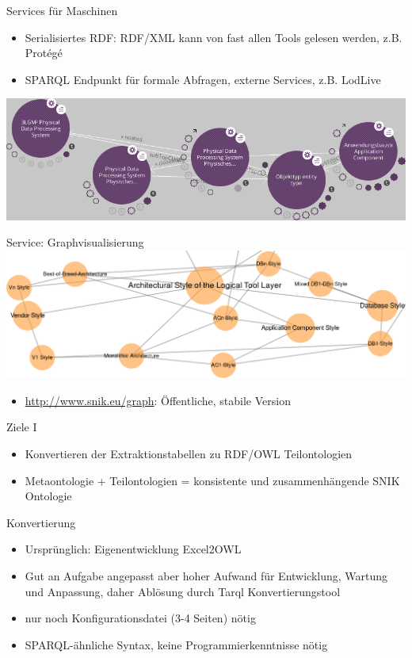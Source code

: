 \documentclass{beamer}
\begin{document}
\begin{frame}{Services für Maschinen}
\begin{itemize}
\item Serialisiertes RDF: RDF/XML kann von fast allen Tools gelesen werden, z.B. Protégé
\item SPARQL Endpunkt für formale Abfragen, externe Services, z.B. LodLive   
\end{itemize}
\includegraphics[width=\textwidth]{img/lodlive.png}
\end{frame}


\begin{frame}{Service: Graphvisualisierung}
\includegraphics[width=\textwidth]{img/graph.png}
\begin{itemize}
\item \url{http://www.snik.eu/graph}: Öffentliche, stabile Version
\end{itemize}
\end{frame}


\begin{frame}{Ziele I}
\begin{itemize}
\item Konvertieren der Extraktionstabellen zu RDF/OWL Teilontologien 
\item Metaontologie + Teilontologien = konsistente und zusammenhängende SNIK Ontologie 
\end{itemize}
\end{frame}

\begin{frame}{Konvertierung}
\begin{itemize}
\item Ursprünglich: Eigenentwicklung Excel2OWL 
\item Gut an Aufgabe angepasst aber hoher Aufwand für Entwicklung, Wartung und Anpassung, daher Ablösung durch Tarql Konvertierungstool
\item nur noch Konfigurationsdatei (3-4 Seiten) nötig
\item SPARQL-ähnliche Syntax, keine Programmierkenntnisse nötig
\end{itemize}
\end{frame}
\end{document}
